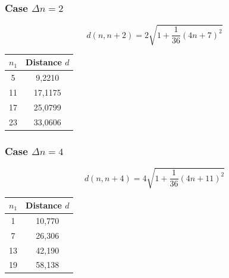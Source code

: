 \noindent
\begin{minipage}[t]{0.48\textwidth}

\subsubsection{Case $\Delta n = 2$}

\begin{equation}
d(n, n+2) = 2\sqrt{1 + \frac{1}{36}(4n + 7)^2}
\end{equation}

\begin{example}[Numerical values for $\Delta n = 2$]
\begin{table}[H]
\centering
\begin{tabular}{cc}
\toprule
$n_1$ & Distance $d$ \\
\midrule
5  & 9{,}2210  \\
11 & 17{,}1175 \\
17 & 25{,}0799 \\
23 & 33{,}0606 \\
\bottomrule
\end{tabular}
\end{table}
\end{example}

\end{minipage}
\hfill
\begin{minipage}[t]{0.48\textwidth}

\subsubsection{Case $\Delta n = 4$}

\begin{equation}
d(n, n+4) = 4\sqrt{1 + \frac{1}{36}(4n + 11)^2}
\end{equation}

\begin{example}[Numerical values for $\Delta n = 4$]
\begin{table}[H]
\centering
\begin{tabular}{cc}
\toprule
$n_1$ & Distance $d$ \\
\midrule
1  & 10{,}770 \\
7  & 26{,}306 \\
13 & 42{,}190 \\
19 & 58{,}138 \\
\bottomrule
\end{tabular}
\end{table}
\end{example}

\end{minipage}

